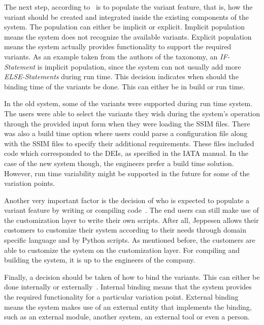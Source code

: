 The next step, according to~\cite{JillesVanGurp2001} %
is to populate the variant feature, that is, how the variant should be created and integrated inside the existing components of the system. The population can either be implicit or explicit. Implicit population means the system does not recognize the available variants. Explicit population means the system actually provides functionality to support the required variants. As an example taken from the authors of the taxonomy, an \textit{IF-Statement} is implicit population, since the system can not usually add more \textit{ELSE-Statements} during run time. This decision indicates when should the binding time of the variants be done. This can either be in build or run time.

In the old system, some of the variants were supported during run time system. The users were able to select the variants they wish during the system's operation through the provided input form when they were loading the SSIM files. There was also a build time option where users could parse a configuration file along with the SSIM files to specify their additional requirements. These files included code which corresponded to the DEIs, as specified in the IATA manual.
In the case of the new system though, the engineers prefer a build time solution. However, run time variability might be supported in the future for some of the variation points. 

Another very important factor is the decision of who is expected to populate a variant feature by writing or compiling code~\cite{JillesVanGurp2001}. %
The end users can still make use of the customization layer to write their own scripts.
After all, Jeppesen allows their customers to customize their system according to their needs through domain specific language and by Python scripts. As mentioned before, the customers are able to customize the system on the customization layer. For compiling and building the system, it is up to the engineers of the company.

Finally, a decision should be taken of how to bind the variants. This can either be done internally or externally~\cite{JillesVanGurp2001}. %
Internal binding means that the system provides the required functionality for a particular variation point. External binding means the system makes use of an external entity that implements the binding, such as an external module, another system, an external tool or even a person.


